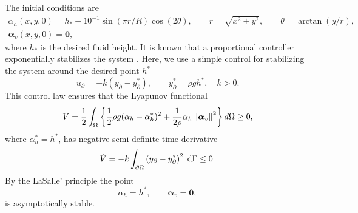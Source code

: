  The initial conditions are
\begin{equation}
\begin{aligned}
\alpha_h(x, y, 0) = h_{*} + 10^{-1} \sin(\pi r/R) \cos(2 \theta), \qquad r = \sqrt{x^2 + y^2}, \qquad \theta = \arctan(y/r), \\
\bm\alpha_v(x, y, 0) = \bm{0},
\end{aligned}
\end{equation}
where $ h_{*}$ is the desired fluid height. It is known that a proportional controller exponentially stabilizes the system \cite{dos2008boundary}. Here, we use a simple control for stabilizing the system around the desired point $h^*$
\begin{equation}\label{eq:ctrllaw_SWE}
u_\partial = -k (y_\partial - y_\partial^*), \qquad y_\partial^*= \rho g h^*, \quad k>0.
\end{equation}
This control law ensures that the Lyapunov functional
\begin{equation}
	V = \frac{1}{2} \int_{\Omega}\left\{\frac{1}{2} \rho g (\alpha_h - \alpha_h^*)^2 + \frac{1}{2\rho} \alpha_h \left\|\bm{\alpha}_v\right\|^2 \right\} d\Omega \ge 0,
\end{equation}
where $\alpha_h^*=h^*$, has negative semi definite time derivative
\begin{equation}
	\dot{V} = -k \int_{\partial \Omega}\left({y}_\partial - {y}_\partial^* \right)^2 \d{\Gamma} \le 0.
\end{equation}
By the LaSalle' principle \cite{henry2006geometric} the point 
\begin{equation}
	\alpha_h = h^*, \qquad \bm{\alpha}_v = \bm{0},
\end{equation}
is asymptotically stable. \\

